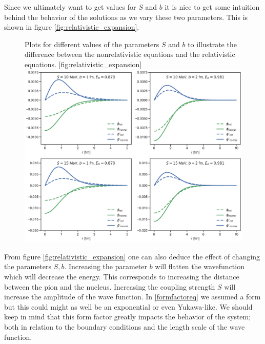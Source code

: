 Since we ultimately want to get values for $S$ and $b$ it is nice to get some intuition behind the behavior of the solutions as we vary these two parameters. This is shown in figure \ref{fig:relativistic_expansion}.
\begin{figure}[H]
    \begin{sidecaption}{Plots for different values of the parameters $S$ and $b$ to illustrate the difference between the nonrelativistic equations and the relativistic equations. }[fig:relativistic_expansion]
    \includegraphics[width=\linewidth]{Figures/RelativisticExpansion.pdf}
    \end{sidecaption}
\end{figure}
From figure \ref{fig:relativistic_expansion} one can also deduce the effect of changing the parameters $S,b$. Increasing the parameter $b$ will flatten the wavefunction which will decrease the energy. This corresponds to increasing the distance between the pion and the nucleus. Increasing the coupling strength $S$ will increase the amplitude of the wave function. In \eqref{formfactoreq} we assumed a form but this could might as well be an exponential or even Yukawa-like. We should keep in mind that this form factor greatly impacts the behavior of the system; both in relation to the boundary conditions and the length scale of the wave function. 

